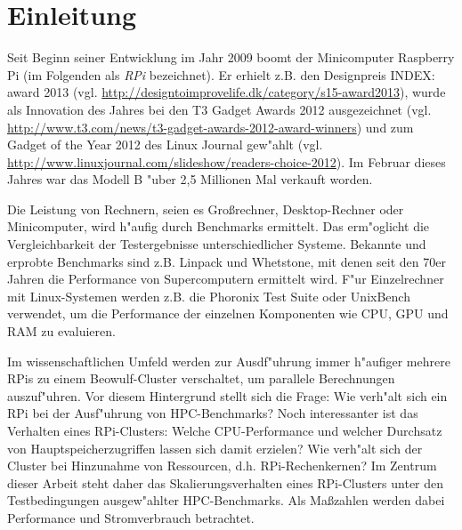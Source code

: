 \chapter{Einleitung}\label{Kap1}
\enlargethispage{0.7cm}
Seit Beginn seiner Entwicklung im Jahr 2009 boomt der Minicomputer Raspberry Pi (im Folgenden als \textit{RPi} bezeichnet). Er erhielt z.B. den Designpreis INDEX: award 2013 (vgl. \url{http://designtoimprovelife.dk/category/s15-award2013}), wurde als Innovation des Jahres bei den T3 Gadget Awards 2012 ausgezeichnet (vgl. \url{http://www.t3.com/news/t3-gadget-awards-2012-award-winners}) und zum Gadget of the Year 2012 des Linux Journal gew"ahlt (vgl. \url{http://www.linuxjournal.com/slideshow/readers-choice-2012}). Im Februar dieses Jahres war das Modell B "uber 2,5 Millionen Mal verkauft worden. 

Die Leistung von Rechnern, seien es Gro\ss rechner, Desktop-Rechner oder Minicomputer, wird h"aufig durch Benchmarks ermittelt. Das erm"oglicht die Vergleichbarkeit der Testergebnisse unterschiedlicher Systeme. Bekannte und erprobte Benchmarks sind z.B. Linpack und Whetstone, mit denen seit den 70er Jahren die Performance von Supercomputern ermittelt wird. F"ur Einzelrechner mit Linux-Systemen werden z.B. die Phoronix Test Suite oder UnixBench verwendet, um die Performance der einzelnen Komponenten wie CPU, GPU und RAM zu evaluieren. 

Im wissenschaftlichen Umfeld werden zur Ausdf"uhrung immer h"aufiger mehrere RPis zu einem Beowulf-Cluster verschaltet, um parallele Berechnungen auszuf"uhren. Vor diesem Hintergrund stellt sich die Frage: Wie verh"alt sich ein RPi bei der Ausf"uhrung von HPC-Benchmarks? Noch interessanter ist das Verhalten eines RPi-Clusters: Welche CPU-Performance und welcher Durchsatz von Hauptspeicherzugriffen lassen sich damit erzielen? Wie verh"alt sich der Cluster bei Hinzunahme von Ressourcen, d.h. RPi-Rechenkernen? Im Zentrum dieser Arbeit steht daher das Skalierungsverhalten eines RPi-Clusters unter den Testbedingungen ausgew"ahlter HPC-Benchmarks. Als Ma\ss zahlen werden dabei Performance und Stromverbrauch betrachtet. 

